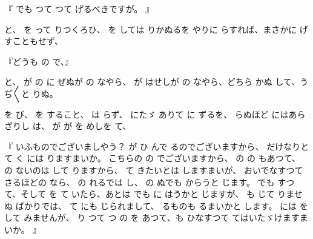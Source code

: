 『
でも
つて
つて
げるべきですが。
』

と、
を
って
りつくろひ、
を
しては
りかぬるを
やりに
らすれば、まさかに
げ
すこともせず、

『どうも
の
で、』

と、
が
の
に
ぜぬが
の
なやら、
が
はせしが
の
なやら、どちら
かぬ
して、うぢ〳〵と
りぬ。

を
び、
を
すること、
は
らず、
にたゞ
ありて
に
ずるを、
らぬほど
にはあらざりし
は、
が
が
を
めしを
て、

『
いふものでございましやう？
が
ひ
んで
るのでございますから、
だけなりと
て
く
には
りますまいか。
こちらの
の
でございますから、
の
の
もあつて、
の
ないのは
して
りますから、
て
きたいとは
しますまいが、
おいでなすつて
さるほどの
なら、
の
れるでは
し、
の
ぬでも
からうと
じます。
でも
すつて、そして
を
て
いたら、あとは
でも
に
はうかと
じますが、
も
じて
りませぬ
ばかりでは、
て
にも
じられまして、
るものも
るまいかと
します。
には
を
して
みませんが、
り
つて
つ
の
を
あつて、も
ひなすつて
てはいたゞけますまいか。
』

